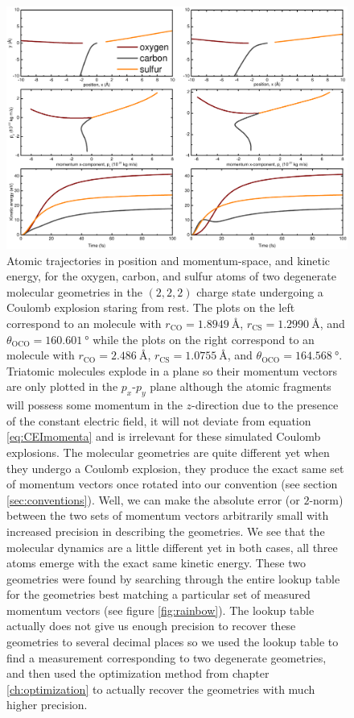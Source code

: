 \begin{figure}
  \centering
  \includegraphics[width=\textwidth]{Plots/DegenerateGeometryTrajectories.pdf}
  \caption[Atomic trajectories in position and momentum-space, and kinetic energy, of two degenerate molecular geometries undergoing a Coulomb explosion.]
  {Atomic trajectories in position and momentum-space, and kinetic energy, for the oxygen, carbon, and sulfur atoms of two degenerate  molecular geometries in the $(2,2,2)$ charge state undergoing a Coulomb explosion staring from rest. The plots on the left correspond to an  molecule with $r_\textrm{CO} = \SI{1.8949}{\angstrom}$, $r_\textrm{CS} = \SI{1.2990}{\angstrom}$, and $\theta_\mathrm{OCO} = \SI{160.601}{\degree}$ while the plots on the right correspond to an  molecule with $r_\textrm{CO} = \SI{2.486}{\angstrom}$, $r_\textrm{CS} = \SI{1.0755}{\angstrom}$, and $\theta_\mathrm{OCO} = \SI{164.568}{\degree}$. Triatomic molecules explode in a plane so their momentum vectors are only plotted in the $p_x$-$p_y$ plane although the atomic fragments will possess some momentum in the $z$-direction due to the presence of the constant electric field, it will not deviate from equation \eqref{eq:CEImomenta} and is irrelevant for these simulated Coulomb explosions. The molecular geometries are quite different yet when they undergo a Coulomb explosion, they produce the exact same set of momentum vectors once rotated into our convention (see section \ref{sec:conventions}). Well, we can make the absolute error (or $2$-norm) between the two sets of momentum vectors arbitrarily small with increased precision in describing the geometries. We see that the molecular dynamics are a little different yet in both cases, all three atoms emerge with the exact same kinetic energy. These two geometries were found by searching through the entire lookup table for the geometries best matching a particular set of measured momentum vectors (see figure \ref{fig:rainbow}). The lookup table actually does not give us enough precision to recover these geometries to several decimal places so we used the lookup table to find a measurement corresponding to two degenerate geometries, and then used the optimization method from chapter \ref{ch:optimization} to actually recover the geometries with much higher precision.}

\end{figure}

